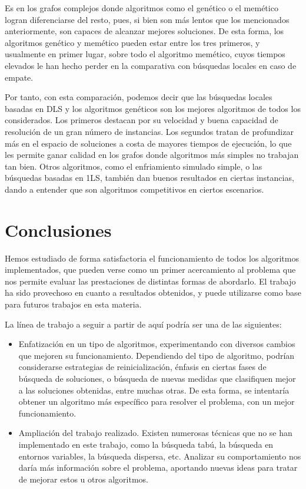Es en los grafos complejos donde algoritmos como el genético o el memético logran
diferenciarse del resto, pues, si bien son más lentos que los mencionados anteriormente,
son capaces de alcanzar mejores soluciones. De esta forma, los algoritmos genético y
memético pueden estar entre los tres primeros, y usualmente en primer lugar, sobre
todo el algoritmo memético, cuyos tiempos elevados le han hecho perder en la comparativa
con búsquedas locales en caso de empate.

Por tanto, con esta comparación, podemos decir que las búsquedas locales basadas en
DLS y los algoritmos genéticos son los mejores algoritmos de todos los considerados.
Los primeros destacan por su velocidad y buena capacidad de resolución de un gran
número de instancias. Los segundos tratan de profundizar más en el espacio de soluciones
a costa de mayores tiempos de ejecución, lo que les permite ganar calidad en los grafos
donde algoritmos más simples no trabajan tan bien. Otros algoritmos, como el
enfriamiento simulado simple, o las búsquedas basadas en 1LS, también dan buenos
resultados en ciertas instancias, dando a entender que son algoritmos competitivos
en ciertos escenarios.


\section{Conclusiones}

Hemos estudiado de forma satisfactoria el funcionamiento de todos los algoritmos implementados,
que pueden verse como un primer acercamiento al problema que nos permite evaluar las
prestaciones de distintas formas de abordarlo. El trabajo ha sido provechoso en cuanto
a resultados obtenidos, y puede utilizarse como base para futuros trabajos en esta materia.

La línea de trabajo a seguir a partir de aquí podría ser una de las siguientes:
\begin{itemize}
  \item Enfatización en un tipo de algoritmos, experimentando con diversos cambios que
        mejoren su funcionamiento. Dependiendo del tipo de algoritmo, podrían considerarse
        estrategias de reinicialización, énfasis en ciertas fases de búsqueda de soluciones,
        o búsqueda de nuevas medidas que clasifiquen mejor a las soluciones obtenidas, entre
        muchas otras. De esta forma, se intentaría obtener un algoritmo más específico para
        resolver el problema, con un mejor funcionamiento.

  \item Ampliación del trabajo realizado. Existen numerosas técnicas que no se han implementado
        en este trabajo, como la búsqueda tabú, la búsqueda en entornos variables, la búsqueda
        dispersa, etc. Analizar su comportamiento nos daría más información sobre el problema,
        aportando nuevas ideas para tratar de mejorar estos u otros algoritmos.
\end{itemize}
